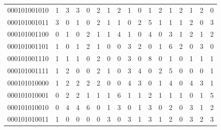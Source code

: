 \documentclass[10pt,a4paper]{article}
\begin{document}
\begin{longtable}{ |c|c|c|c|c|c|c|c|c|c|c|c|c|c|c|c|c| }
    000101001010              & 1                            & 3                                & 3                            & 0                              & 2   & 1   & 2   & 1   & 0   & 1   & 2   & 1   & 2   & 1   & 2   & 0   \\
    000101001011              & 3                            & 0                                & 1                            & 0                              & 2   & 1   & 1   & 0   & 2   & 5   & 1   & 1   & 1   & 2   & 0   & 3   \\
    000101001100              & 0                            & 1                                & 0                            & 2                              & 1   & 1   & 4   & 1   & 0   & 4   & 0   & 3   & 1   & 2   & 1   & 2   \\
    000101001101              & 1                            & 0                                & 1                            & 2                              & 1   & 0   & 0   & 3   & 2   & 0   & 1   & 6   & 2   & 0   & 3   & 0   \\
    000101001110              & 1                            & 1                                & 1                            & 0                              & 2   & 0   & 0   & 3   & 0   & 8   & 0   & 1   & 0   & 1   & 1   & 1   \\
    000101001111              & 1                            & 2                                & 0                            & 0                              & 2   & 1   & 0   & 3   & 4   & 0   & 2   & 5   & 0   & 0   & 0   & 1   \\
    000101010000              & 1                            & 2                                & 2                            & 2                              & 2   & 0   & 0   & 4   & 3   & 0   & 1   & 4   & 0   & 4   & 3   & 1   \\
    000101010001              & 0                            & 2                                & 2                            & 1                              & 1   & 1   & 6   & 1   & 1   & 2   & 1   & 1   & 1   & 0   & 1   & 5   \\
    000101010010              & 0                            & 4                                & 4                            & 6                              & 0   & 1   & 3   & 0   & 1   & 3   & 0   & 2   & 0   & 3   & 1   & 2   \\
    000101010011              & 1                            & 0                                & 0                            & 0                              & 0   & 3   & 0   & 3   & 1   & 3   & 1   & 2   & 0   & 3   & 2   & 3   \\

\end{longtable}
\end{document}
